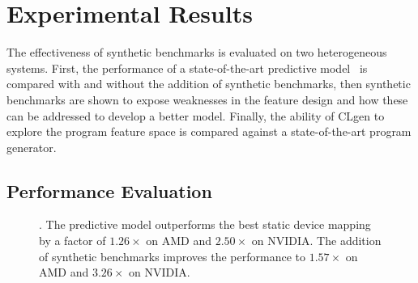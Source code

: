 \section{Experimental Results}
\label{sec:clgen-eval-results}

The effectiveness of synthetic benchmarks is evaluated on two heterogeneous systems. First, the performance of a state-of-the-art predictive model~\cite{Grewe2013} is compared with and without the addition of synthetic benchmarks, then synthetic benchmarks are shown to expose weaknesses in the feature design and how these can be addressed to develop a better model. Finally, the ability of CLgen to explore the program feature space is compared against a state-of-the-art program generator.

\subsection{Performance Evaluation}

\begin{figure}
  \centering %
  \caption[Speedup of predictions with and without synthetic benchmarks]{%
    . The predictive model outperforms the best static device mapping by a factor of $1.26\times$ on AMD and $2.50\times$ on NVIDIA. The addition of synthetic benchmarks improves the performance to $1.57\times$ on AMD and $3.26\times$ on NVIDIA.%
  }%
  \label{fig:npb} %
\end{figure}

